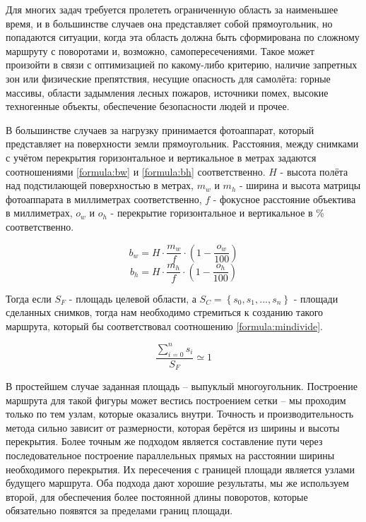 Для многих задач требуется пролететь ограниченную область за наименьшее время, и в большинстве случаев она представляет собой прямоугольник, но попадаются ситуации, когда эта область должна быть сформирована по сложному маршруту с поворотами и, возможно, самопересечениями. Такое может произойти в связи с оптимизацией по какому-либо критерию, наличие запретных зон или физические препятствия, несущие опасность для самолёта: горные массивы, области задымления лесных пожаров, источники помех, высокие техногенные объекты, обеспечение безопасности людей и прочее.


В большинстве случаев за нагрузку принимается фотоаппарат, который представляет на поверхности земли прямоугольник. Расстояния, между снимками с учётом перекрытия горизонтальное и вертикальное в метрах задаются соотношениями \ref{formula:bw} и \ref{formula:bh} соответственно. $H$ - высота полёта над подстилающей поверхностью в метрах, $m_w$ и $m_h$ - ширина и высота матрицы фотоаппарата в миллиметрах соответственно, $f$ - фокусное расстояние объектива в миллиметрах, $o_w$ и $o_h$ - перекрытие горизонтальное и вертикальное в \% соответственно.

\begin{equation}
b_w=H\cdot\frac{m_w}{f}\cdot\left( 1 - \frac{o_w}{100}\right) 
\label{formula:bw}
\end{equation}
\begin{equation}
b_h=H\cdot\frac{m_h}{f}\cdot\left( 1 - \frac{o_h}{100}\right) 
\label{formula:bh}
\end{equation}

Тогда если $S_F$ - площадь целевой области, а $S_C=\left\lbrace s_0, s_1,...,s_n\right\rbrace$ - площади сделанных снимков, тогда нам необходимо стремиться к созданию такого маршрута, который бы соответствовал соотношению \ref{formula:mindivide}.

\begin{equation}
\frac{\sum_{i=0}^{n} s_i}{S_F} \simeq 1
\label{formula:mindivide}
\end{equation}

В простейшем случае заданная площадь -- выпуклый многоугольник. Построение маршрута для такой фигуры может вестись построением сетки \cite{NamHuang} -- мы проходим только по тем узлам, которые оказались внутри. Точность и производительность метода сильно зависит от размерности, которая берётся из ширины и высоты перекрытия. Более точным же подходом является составление пути через последовательное построение параллельных прямых на расстоянии ширины необходимого перекрытия. Их пересечения с границей площади является узлами будущего маршрута\cite{EnergyAware}. Оба подхода дают хорошие результаты, мы же используем второй, для обеспечения более постоянной длины поворотов, которые обязательно появятся за пределами границ площади. 

